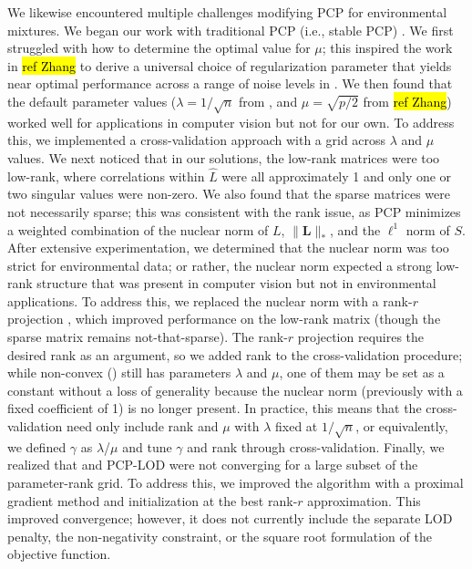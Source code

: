 We likewise encountered multiple challenges modifying PCP for environmental mixtures. We began our work with traditional PCP (i.e., stable PCP) \citep{candes2011robust, zhou2010stable}. We first struggled with how to determine the optimal value for $\mu$; this inspired the work in \hl{ref Zhang} to derive a universal choice of regularization parameter that yields near optimal performance across a range of noise levels in \rootpcpc. We then found that the default parameter values ($\lambda = 1/\sqrt{n}$ from \citet{candes2011robust}, and $\mu = \sqrt{p/2}$ from \hl{ref Zhang}) worked well for applications in computer vision but not for our own. To address this, we implemented a cross-validation approach with a grid across $\lambda$ and $\mu$ values. We next noticed that in our solutions, the low-rank matrices were too low-rank, where correlations within $\hat{L}$ were all approximately 1 and only one or two singular values were non-zero. We also found that the sparse matrices were not necessarily sparse; this was consistent with the rank issue, as PCP minimizes a weighted combination of the nuclear norm of $L$, $\|\boldsymbol{L}\|_{*}$, and the $\ell^1$ norm of $S$. After extensive experimentation, we determined that the nuclear norm was too strict for environmental data; or rather, the nuclear norm expected a strong low-rank structure that was present in computer vision but not in environmental applications. To address this, we replaced the nuclear norm with a rank-$r$ projection \citep{netrapalli2014non, chen2020bridging}, which improved performance on the low-rank matrix (though the sparse matrix remains not-that-sparse). The rank-$r$ projection requires the desired rank as an argument, so we added rank to the cross-validation procedure; while non-convex \rootpcp (\ncpcpc) still has parameters $\lambda$ and $\mu$, one of them may be set as a constant without a loss of generality because the nuclear norm (previously with a fixed coefficient of 1) is no longer present. In practice, this means that the cross-validation need only include rank and $\mu$ with $\lambda$ fixed at $1/\sqrt{n}$, or equivalently, we defined $\gamma$ as $\lambda$/$\mu$ and tune $\gamma$ and rank through cross-validation. Finally, we realized that \ncpcp and PCP-LOD were not converging for a large subset of the parameter-rank grid. To address this, we improved the algorithm with a proximal gradient method and initialization at the best rank-$r$ approximation. This improved convergence; however, it does not currently include the separate LOD penalty, the non-negativity constraint, or the square root formulation of the objective function.

